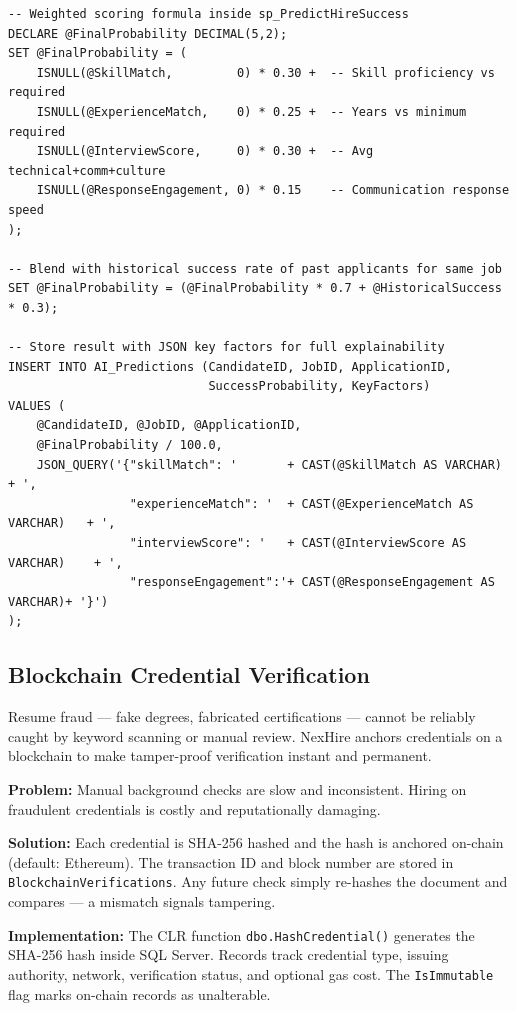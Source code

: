 \documentclass[11pt,a4paper]{article}
\begin{document}
\begin{verbatim}
-- Weighted scoring formula inside sp_PredictHireSuccess
DECLARE @FinalProbability DECIMAL(5,2);
SET @FinalProbability = (
    ISNULL(@SkillMatch,         0) * 0.30 +  -- Skill proficiency vs required
    ISNULL(@ExperienceMatch,    0) * 0.25 +  -- Years vs minimum required
    ISNULL(@InterviewScore,     0) * 0.30 +  -- Avg technical+comm+culture
    ISNULL(@ResponseEngagement, 0) * 0.15    -- Communication response speed
);

-- Blend with historical success rate of past applicants for same job
SET @FinalProbability = (@FinalProbability * 0.7 + @HistoricalSuccess * 0.3);

-- Store result with JSON key factors for full explainability
INSERT INTO AI_Predictions (CandidateID, JobID, ApplicationID,
                            SuccessProbability, KeyFactors)
VALUES (
    @CandidateID, @JobID, @ApplicationID,
    @FinalProbability / 100.0,
    JSON_QUERY('{"skillMatch": '       + CAST(@SkillMatch AS VARCHAR)        + ',
                 "experienceMatch": '  + CAST(@ExperienceMatch AS VARCHAR)   + ',
                 "interviewScore": '   + CAST(@InterviewScore AS VARCHAR)    + ',
                 "responseEngagement":'+ CAST(@ResponseEngagement AS VARCHAR)+ '}')
);
\end{verbatim}

\subsection{Blockchain Credential Verification}

\noindent
Resume fraud --- fake degrees, fabricated certifications --- cannot be reliably caught by keyword scanning or manual review. NexHire anchors credentials on a blockchain to make tamper-proof verification instant and permanent.

\textbf{Problem:} Manual background checks are slow and inconsistent. Hiring on fraudulent credentials is costly and reputationally damaging.

\textbf{Solution:} Each credential is SHA-256 hashed and the hash is anchored on-chain (default: Ethereum). The transaction ID and block number are stored in \texttt{BlockchainVerifications}. Any future check simply re-hashes the document and compares --- a mismatch signals tampering.

\textbf{Implementation:} The CLR function \texttt{dbo.HashCredential()} generates the SHA-256 hash inside SQL Server. Records track credential type, issuing authority, network, verification status, and optional gas cost. The \texttt{IsImmutable} flag marks on-chain records as unalterable.
\end{document}
